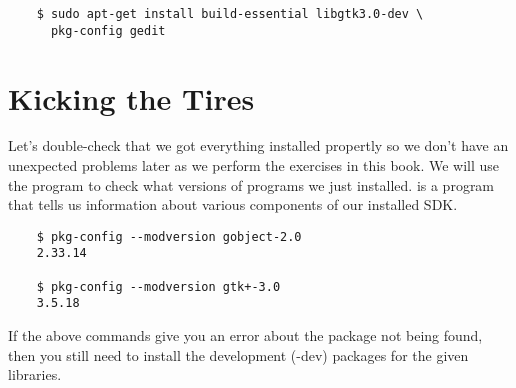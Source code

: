\begin{Verbatim}
    $ sudo apt-get install build-essential libgtk3.0-dev \
      pkg-config gedit
\end{Verbatim}


\section{Kicking the Tires}

Let's double-check that we got everything installed propertly so we don't have
an unexpected problems later as we perform the exercises in this book.  We will
use the  program to check what versions of programs we just
installed. \ident{pkg-config} is a program that tells us information about
various components of our installed SDK.

\begin{Verbatim}
    $ pkg-config --modversion gobject-2.0
    2.33.14

    $ pkg-config --modversion gtk+-3.0
    3.5.18
\end{Verbatim}

If the above commands give you an error about the package not being found, then
you still need to install the development (-dev) packages for the given
libraries.
